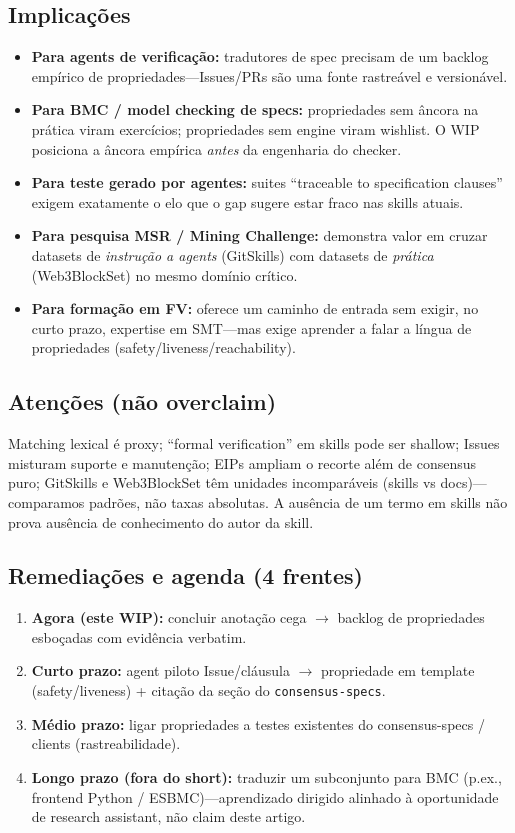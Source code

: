 \documentclass[10pt,conference]{IEEEtran}
\begin{document}
\subsection{Implicações}
\begin{itemize}
\item \textbf{Para agents de verificação:} tradutores de spec precisam de um backlog empírico de propriedades---Issues/PRs são uma fonte rastreável e versionável.
\item \textbf{Para BMC / model checking de specs:} propriedades sem âncora na prática viram exercícios; propriedades sem engine viram wishlist. O WIP posiciona a âncora empírica \emph{antes} da engenharia do checker.
\item \textbf{Para teste gerado por agentes:} suites ``traceable to specification clauses''~\cite{consensusSpecs} exigem exatamente o elo que o gap sugere estar fraco nas skills atuais.
\item \textbf{Para pesquisa MSR / Mining Challenge:} demonstra valor em cruzar datasets de \emph{instrução a agents} (GitSkills) com datasets de \emph{prática} (Web3BlockSet) no mesmo domínio crítico.
\item \textbf{Para formação em FV:} oferece um caminho de entrada sem exigir, no curto prazo, expertise em SMT---mas exige aprender a falar a língua de propriedades (safety/liveness/reachability).
\end{itemize}

\subsection{Atenções (não overclaim)}
Matching lexical é proxy; ``formal verification'' em skills pode ser shallow; Issues misturam suporte e manutenção; EIPs ampliam o recorte além de consensus puro; GitSkills e Web3BlockSet têm unidades incomparáveis (skills vs docs)---comparamos padrões, não taxas absolutas. A ausência de um termo em skills não prova ausência de conhecimento do autor da skill.

\subsection{Remediações e agenda (4 frentes)}
\begin{enumerate}
\item \textbf{Agora (este WIP):} concluir anotação cega $\rightarrow$ backlog de propriedades esboçadas com evidência verbatim.
\item \textbf{Curto prazo:} agent piloto Issue/cláusula $\rightarrow$ propriedade em template (safety/liveness) + citação da seção do \texttt{consensus-specs}.
\item \textbf{Médio prazo:} ligar propriedades a testes existentes do consensus-specs / clients (rastreabilidade).
\item \textbf{Longo prazo (fora do short):} traduzir um subconjunto para BMC (p.ex., frontend Python / ESBMC)---aprendizado dirigido alinhado à oportunidade de research assistant, não claim deste artigo.
\end{enumerate}
\end{document}
